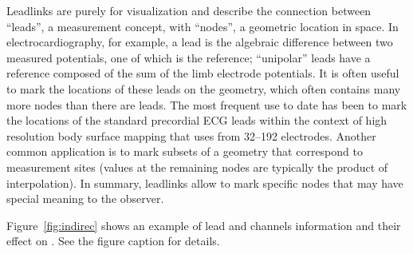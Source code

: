 Leadlinks are purely for visualization and describe the connection between
``leads'', a measurement concept, with ``nodes'', a geometric location in
space.  In electrocardiography, for example, a lead is the algebraic
difference between two measured potentials, one of which is the reference;
``unipolar'' leads have a reference composed of the sum of the limb
electrode potentials.  It is often useful to mark the locations of these
leads on the geometry, which often contains many more nodes than there are
leads.  The most frequent use to date has been to mark the locations of the
standard precordial ECG leads within the context of high resolution body
surface mapping that uses from 32--192 electrodes.  Another common
application is to mark subsets of a geometry that correspond to 
measurement sites (values at the remaining nodes are typically the product
of interpolation).  In summary, leadlinks allow \map{} to mark specific
nodes that may have special meaning to the observer.

Figure~\ref{fig:indirec} shows an example of lead and channels
information and their effect on \map{}.  See the figure caption for
details. 


